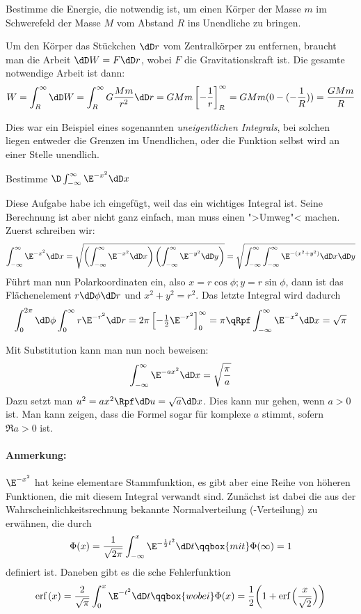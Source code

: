 \NA Bestimme die Energie, die notwendig ist, um einen Körper der Masse $m$ im
Schwerefeld der Masse $M$ vom Abstand $R$ ins Unendliche zu bringen.

Um den Körper das Stückchen $\dD r$ vom Zentralkörper zu entfernen, braucht
man die Arbeit $\dD W=F\dD r$, wobei $F$ die Gravitationskraft ist. Die gesamte
notwendige Arbeit ist dann:
\[
W=\int_R^{\infty}\dD W=\int_R^{\infty}G\frac{Mm}{r^2}\dD r=
GMm\left[-\frac{1}{r}\right]_R^{\infty}=GMm(0-(-\frac{1}{R}))=\frac{GMm}{R}
\]

Dies war ein Beispiel eines sogenannten \emph{uneigentlichen Integrals}, bei
solchen liegen entweder die Grenzen im Unendlichen, oder die Funktion selbst
wird an einer Stelle unendlich.

\NA Bestimme $ \D\int_{-\infty}^{\infty}\E^{-x^2}\dD x$

Diese Aufgabe habe ich eingefügt, weil das ein wichtiges Integral ist. Seine
Berechnung ist aber nicht ganz einfach, man muss einen ">Umweg"< machen.
Zuerst schreiben wir:
\[
\int_{-\infty}^{\infty}\E^{-x^2}\dD x=
\sqrt{\left(\int_{-\infty}^{\infty}\E^{-x^2}\dD x\right)
  \left(\int_{-\infty}^{\infty}\E^{-y^2}\dD y\right)}=
\sqrt{\int_{-\infty}^{\infty}\int_{-\infty}^{\infty}
    \E^{-(x^2+y^2)}\dD x\dD y}
\]
Führt man nun Polarkoordinaten ein, also $x=r\cos\phi; y=r\sin\phi$, dann ist
das Flächenelement $r\dD\phi\dD r$ und $x^2+y^2=r^2$. Das letzte Integral wird
dadurch
\[
\int_0^{2\pi}\dD\phi\int_0^{\infty}r\E^{-r^2}\dD r
=2\pi\left[-\tfrac12\E^{-r^2}\right]_0^{\infty}=\pi \qRpf
\int_{-\infty}^{\infty}\E^{-x^2}\dD x=\sqrt{\pi}
\]

Mit Substitution kann man nun noch beweisen:
\[
\int_{-\infty}^{\infty}\E^{-a x^2}\dD x=\sqrt{\frac{\pi}{a}}
\]
Dazu setzt man $u^2=ax^2\Rpf\dD u=\sqrt{a}\dD x$. Dies kann nur gehen, wenn
$a>0$ ist. Man kann zeigen, dass die Formel sogar für komplexe $a$ stimmt,
sofern $\Re a>0$ ist.

\paragraph{Anmerkung:} $\E^{-x^2}$ hat keine elementare Stammfunktion, es gibt
aber eine Reihe von höheren Funktionen, die mit diesem Integral verwandt sind.
Zunächst ist dabei die aus der Wahrscheinlichkeitsrechnung bekannte
Normalverteilung (-Verteilung) zu erwähnen, die durch
\[
\Phi(x)=\frac{1}{\sqrt{2\pi}}\int_{-\infty}^x\E^{-\frac{1}{2}t^2}\dD t
\qqbox{mit}\Phi(\infty)=1
\]
definiert ist. Daneben gibt es die sche Fehlerfunktion
\[
\textrm{erf}\,(x)=\frac{2}{\sqrt{\pi}}\int_0^x\E^{-t^2}\dD t\qqbox{wobei}
\Phi(x)=\frac{1}{2}\biggl(1+\textrm{erf}\,\Bigl(\frac{x}{\sqrt{2}}\Bigr)\biggr)
\]

